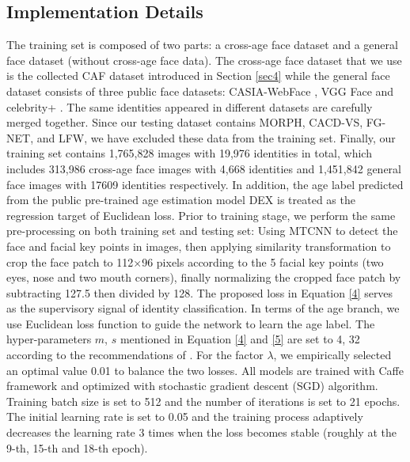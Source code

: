 \documentclass[runningheads]{llncs}
\begin{document}
\subsection{Implementation Details}
The training set is composed of two parts: a cross-age face dataset and a general face dataset (without cross-age face data). The cross-age face dataset that we use is the collected CAF dataset introduced in Section \ref{sec4} while the general face dataset consists of three public face datasets: CASIA-WebFace \cite{webface}, VGG Face \cite{vggface} and celebrity+ \cite{celeb}.
The same identities appeared in different datasets are carefully merged together. Since our testing dataset contains MORPH, CACD-VS, FG-NET, and LFW, we have excluded these data from the training set.
Finally, our training set contains 1,765,828 images with 19,976 identities in total, which includes 313,986 cross-age face images with 4,668 identities and 1,451,842 general face images with 17609 identities respectively.
In addition, the age label predicted from the public pre-trained age estimation model DEX \cite{imdb2} is treated as the regression target of Euclidean loss.
Prior to training stage, we perform the same pre-processing on both training set and testing set: Using MTCNN \cite{mtcnn} to detect the face and facial key points in images, then applying similarity transformation to crop the face patch to 112$\times$96 pixels according to the 5 facial key points (two eyes, nose and two
mouth corners), finally normalizing the cropped face patch by subtracting 127.5 then divided by 128. The proposed loss in Equation \ref{4} serves as the supervisory signal of identity classification. In terms of the age branch, we use Euclidean loss function to guide the network to learn the age label. 
The hyper-parameters $m$, $s$ mentioned in Equation \ref{4} and \ref{5} are set to 4, 32 according to the recommendations of \cite{sphereface,normface}. For the factor $\lambda$, we empirically selected an optimal value 0.01 to balance the two losses.
All models are trained with Caffe \cite{caffe} framework and optimized with stochastic gradient descent (SGD) algorithm. Training batch size is set to 512 and the number of iterations is set to 21 epochs. The initial learning rate is set to 0.05 and the training process adaptively decreases the learning rate 3 times when the loss becomes stable (roughly at the 9-th, 15-th and 18-th epoch). 
\end{document}
